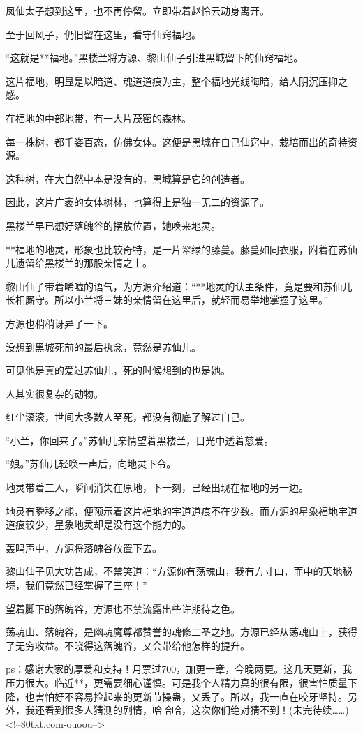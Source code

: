 \begin{this_body}
凤仙太子想到这里，也不再停留。立即带着赵怜云动身离开。

至于回风子，仍旧留在这里，看守仙窍福地。

“这就是**福地。”黑楼兰将方源、黎山仙子引进黑城留下的仙窍福地。

这片福地，明显是以暗道、魂道道痕为主，整个福地光线晦暗，给人阴沉压抑之感。

在福地的中部地带，有一大片茂密的森林。

每一株树，都千姿百态，仿佛女体。这便是黑城在自己仙窍中，栽培而出的奇特资源。

这种树，在大自然中本是没有的，黑城算是它的创造者。

因此，这片广袤的女体树林，也算得上是独一无二的资源了。

黑楼兰早已想好落魄谷的摆放位置，她唤来地灵。

**福地的地灵，形象也比较奇特，是一片翠绿的藤蔓。藤蔓如同衣服，附着在苏仙儿遗留给黑楼兰的那股亲情之上。

黎山仙子带着唏嘘的语气，为方源介绍道：“**地灵的认主条件，竟是要和苏仙儿长相厮守。所以小兰将三妹的亲情留在这里后，就轻而易举地掌握了这里。”

方源也稍稍讶异了一下。

没想到黑城死前的最后执念，竟然是苏仙儿。

可见他是真的爱过苏仙儿，死的时候想到的也是她。

人其实很复杂的动物。

红尘滚滚，世间大多数人至死，都没有彻底了解过自己。

“小兰，你回来了。”苏仙儿亲情望着黑楼兰，目光中透着慈爱。

“娘。”苏仙儿轻唤一声后，向地灵下令。

地灵带着三人，瞬间消失在原地，下一刻，已经出现在福地的另一边。

地灵有瞬移之能，便预示着这片福地的宇道道痕不在少数。而方源的星象福地宇道道痕较少，星象地灵却是没有这个能力的。

轰鸣声中，方源将落魄谷放置下去。

黎山仙子见大功告成，不禁笑道：“方源你有荡魂山，我有方寸山，而中的天地秘境，我们竟然已经掌握了三座！”

望着脚下的落魄谷，方源也不禁流露出些许期待之色。

荡魂山、落魄谷，是幽魂魔尊都赞誉的魂修二圣之地。方源已经从荡魂山上，获得了无穷收益。不晓得这落魄谷，又会带给他怎样的提升。

ps：感谢大家的厚爱和支持！月票过700，加更一章，今晚两更。这几天更新，我压力很大。临近**，更需要细心谨慎。可是我个人精力真的很有限，很害怕质量下降，也害怕好不容易捡起来的更新节操蛊，又丢了。所以，我一直在咬牙坚持。另外，我还看到很多人猜测的剧情，哈哈哈，这次你们绝对猜不到！(未完待续……)<!--80txt.com-ouoou-->

\end{this_body}

